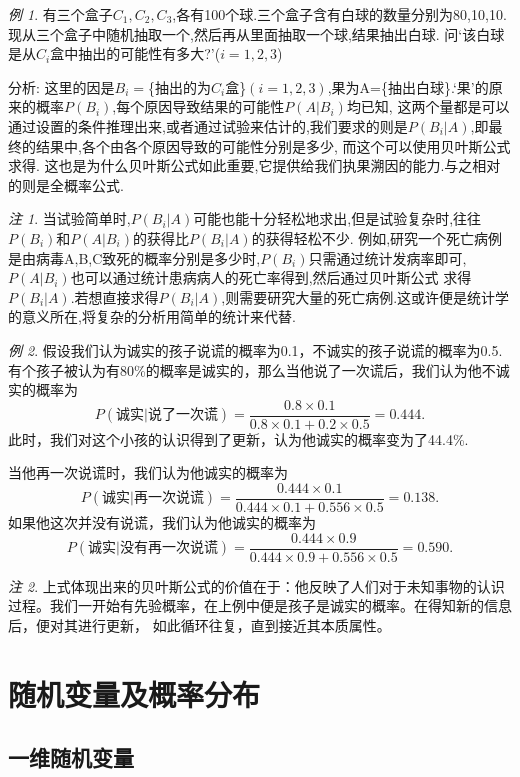 \documentclass[a4paper,11pt]{article}%
\theoremstyle{remark}
\newtheorem*{remark}{注}
\theoremstyle{remark}
\newtheorem*{example}{例}
\theoremstyle{definition}
\theoremstyle{definition}
\theoremstyle{plain}
\begin{document}
\begin{example}
    有三个盒子$C_1,C_2,C_3$,各有100个球.三个盒子含有白球的数量分别为80,10,10.现从三个盒子中随机抽取一个,然后再从里面抽取一个球,结果抽出白球.
    问`该白球是从$C_i$盒中抽出的可能性有多大?'($i=1,2,3$)

    分析:
    这里的因是$B_i=$\{抽出的为$C_i$盒\}$(i=1,2,3)$,果为A=\{抽出白球\}.`果'的原来的概率$P(B_i)$,每个原因导致结果的可能性$P(A|B_i)$均已知,
    这两个量都是可以通过设置的条件推理出来,或者通过试验来估计的,我们要求的则是$P(B_i|A)$,即最终的结果中,各个由各个原因导致的可能性分别是多少,
    而这个可以使用贝叶斯公式求得.
    这也是为什么贝叶斯公式如此重要,它提供给我们执果溯因的能力.与之相对的则是全概率公式.
\end{example}
\begin{remark}
    当试验简单时,$P(B_i|A)$可能也能十分轻松地求出,但是试验复杂时,往往$P(B_i)$和$P(A|B_i)$的获得比$P(B_i|A)$的获得轻松不少.
    例如,研究一个死亡病例是由病毒A,B,C致死的概率分别是多少时,$P(B_i)$只需通过统计发病率即可,$P(A|B_i)$也可以通过统计患病病人的死亡率得到,然后通过贝叶斯公式
    求得$P(B_i|A)$.若想直接求得$P(B_i|A)$,则需要研究大量的死亡病例.这或许便是统计学的意义所在,将复杂的分析用简单的统计来代替.
\end{remark}
\begin{example}
    假设我们认为诚实的孩子说谎的概率为0.1，不诚实的孩子说谎的概率为0.5.有个孩子被认为有80\%的概率是诚实的，那么当他说了一次谎后，我们认为他不诚实的概率为
    \[P(\text{诚实}|\text{说了一次谎})=\frac{0.8\times 0.1}{0.8\times 0.1+0.2\times 0.5}=0.444.\]
    此时，我们对这个小孩的认识得到了更新，认为他诚实的概率变为了44.4\%.

    当他再一次说谎时，我们认为他诚实的概率为
    \[P(\text{诚实}|\text{再一次说谎})=\frac{0.444\times 0.1}{0.444\times 0.1+0.556\times 0.5}=0.138.\]
    如果他这次并没有说谎，我们认为他诚实的概率为
    \[P(\text{诚实}|\text{没有再一次说谎})=\frac{0.444\times 0.9}{0.444\times 0.9+0.556\times 0.5}=0.590.\]
\end{example}
\begin{remark}
    上式体现出来的贝叶斯公式的价值在于：他反映了人们对于未知事物的认识过程。我们一开始有先验概率，在上例中便是孩子是诚实的概率。在得知新的信息后，便对其进行更新，
    如此循环往复，直到接近其本质属性。
\end{remark}
\section{随机变量及概率分布}
\subsection{一维随机变量}
\end{document}
